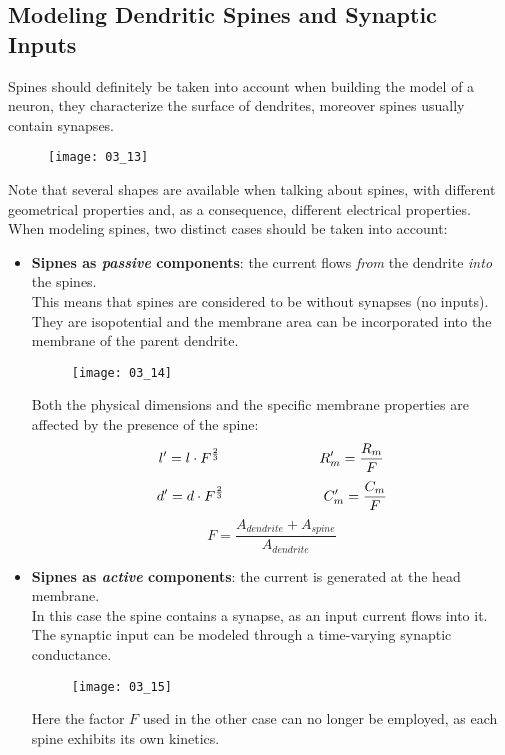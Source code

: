 \subsection{Modeling Dendritic Spines and Synaptic Inputs}
Spines should definitely be taken into account when building the model of a neuron, they
characterize the surface of dendrites, moreover spines usually contain synapses.
\begin{figure}[H]
    \texttt{[image: 03\_13]}
    \centering
\end{figure}
Note that several shapes are available when talking about spines, with different
geometrical properties and, as a consequence, different electrical properties.\\
When modeling spines, two distinct cases should be taken into account:
\begin{itemize}
    \item \textbf{Sipnes as \textit{passive} components}: the current flows \textit{from}
          the dendrite \textit{into} the spines.\\
          This means that spines are considered to be without synapses (no inputs). They are
          isopotential and the membrane area can be incorporated into the membrane of the parent dendrite.
          \begin{figure}[H]
              \texttt{[image: 03\_14]}
              \centering
          \end{figure}
          Both the physical dimensions and the specific membrane properties are affected by the presence
          of the spine:
          \begin{equation*}
              l'=l\cdot{F^{\frac{2}{3}}}
              \hspace{2.5cm}
              R_{m}'=\frac{R_{m}}{F}
          \end{equation*}
          \begin{equation*}
              d'=d\cdot{F^{\frac{2}{3}}}
              \hspace{2.5cm}
              C_{m}'=\frac{C_{m}}{F}
          \end{equation*}
          \begin{equation*}
              F=\frac{A_{dendrite}+A_{spine}}{A_{dendrite}}
          \end{equation*}
    \item \textbf{Sipnes as \textit{active} components}: the current is generated at the head membrane.\\
          In this case the spine contains a synapse, as an input current flows into it. The synaptic input
          can be modeled through a time-varying synaptic conductance.
          \begin{figure}[H]
              \texttt{[image: 03\_15]}
              \centering
          \end{figure}
          Here the factor \(F\) used in the
          other case can no longer be employed, as each spine exhibits its own kinetics.
\end{itemize}